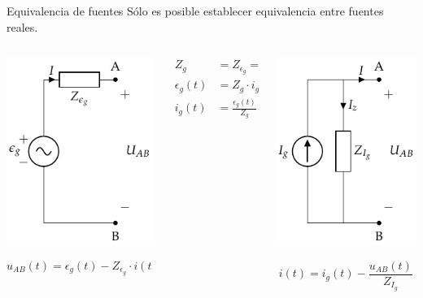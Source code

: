 \documentclass[xcolor={usenames,svgnames,dvipsnames}]{beamer}
\begin{document}
\begin{frame}[label={sec:orgdfbbaa8}]{Equivalencia de fuentes}
Sólo es posible establecer equivalencia entre \alert{fuentes reales}.
\begin{columns}
\begin{column}{0.33\columnwidth}
\begin{center}
\includegraphics[height=0.5\textheight]{figs/FuenteTensionReal.pdf}
\end{center}
\[
  u_{AB}(t) = \epsilon_g(t) - Z_{\epsilon_g} \cdot i(t)
\]
\end{column}
\begin{column}{0.33\columnwidth}
\begin{align*}
  Z_g &= Z_{\epsilon_g} = Z_{I_g}\\
  \epsilon_g(t) &= Z_g \cdot i_g(t)\\
  i_g(t) &= \frac{\epsilon_g(t)}{Z_g}
\end{align*}
\end{column}
\begin{column}{0.33\columnwidth}
\begin{center}
\includegraphics[height=0.5\textheight]{figs/FuenteCorrienteReal.pdf}
\end{center}
\[
  i(t) = i_g(t) - \frac{u_{AB}(t)}{Z_{I_g}}
\]
\end{column}
\end{columns}
\end{frame}
\end{document}
